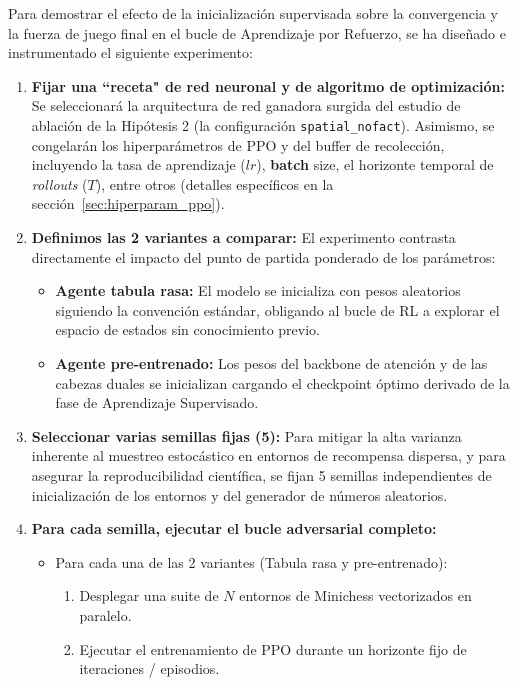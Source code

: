 \documentclass[12pt, a4paper]{article}
\begin{document}
Para demostrar el efecto de la inicialización supervisada sobre la convergencia y la fuerza de juego final en el bucle de Aprendizaje por Refuerzo, se ha diseñado e instrumentado el siguiente experimento:

\begin{enumerate}
\item \textbf{Fijar una ``receta" de red neuronal y de algoritmo de optimización:} Se seleccionará la arquitectura de red ganadora surgida del estudio de ablación de la Hipótesis 2 (la configuración \texttt{spatial\_nofact}). Asimismo, se congelarán los hiperparámetros de PPO y del buffer de recolección, incluyendo la tasa de aprendizaje ($lr$), \textbf{batch} size, el horizonte temporal de \textit{rollouts} ($T$), entre otros (detalles específicos en la sección~\ref{sec:hiperparam_ppo}).
\item \textbf{Definimos las 2 variantes a comparar:} El experimento contrasta directamente el impacto del punto de partida ponderado de los parámetros:
    \begin{itemize}
        \item \textbf{Agente tabula rasa:} El modelo se inicializa con pesos aleatorios siguiendo la convención estándar, obligando al bucle de RL a explorar el espacio de estados sin conocimiento previo.
        \item \textbf{Agente pre-entrenado:} Los pesos del backbone de atención y de las cabezas duales se inicializan cargando el checkpoint óptimo derivado de la fase de Aprendizaje Supervisado.
    \end{itemize}
\item \textbf{Seleccionar varias semillas fijas (5):} Para mitigar la alta varianza inherente al muestreo estocástico en entornos de recompensa dispersa, y para asegurar la reproducibilidad científica, se fijan 5 semillas independientes de inicialización de los entornos y del generador de números aleatorios.
\item \textbf{Para cada semilla, ejecutar el bucle adversarial completo:}
    \begin{itemize}
        \item Para cada una de las 2 variantes (Tabula rasa y pre-entrenado):
            \begin{enumerate}
                \item Desplegar una suite de $N$ entornos de Minichess vectorizados en paralelo.
                \item Ejecutar el entrenamiento de PPO durante un horizonte fijo de iteraciones / episodios.

\end{enumerate}
\end{itemize}
\end{enumerate}
\end{document}
